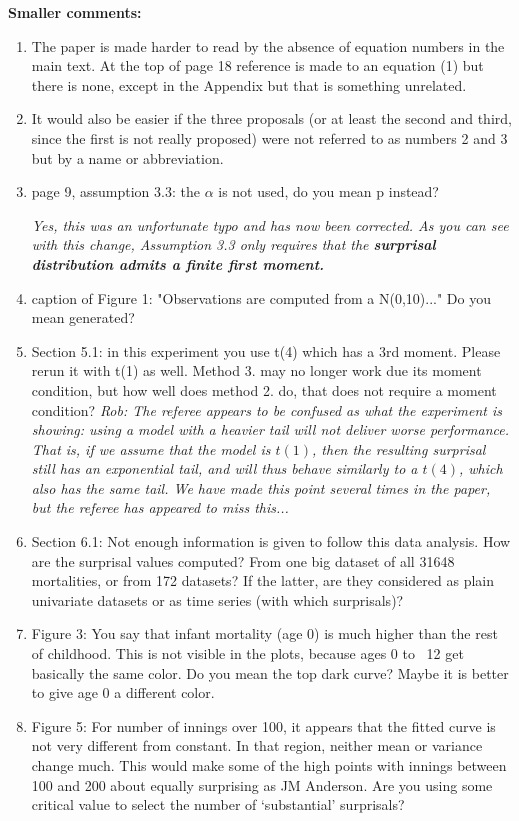 \documentclass[a4paper,11pt]{article}
\begin{document}
\noindent \textbf{Smaller comments:}
\begin{enumerate}
  \item[-] The paper is made harder to read by the absence of equation numbers in the main text. At the top of page 18 reference is made to an equation (1) but there is none, except in the Appendix but that is something unrelated.
  \item[-] It would also be easier if the three proposals (or at least the second and third, since the first is not really proposed) were not referred to as numbers 2 and 3 but by a name or abbreviation.
  \item[-] page 9, assumption 3.3: the $\alpha$ is not used, do you mean p instead?

    \textit{Yes, this was an unfortunate typo and has now been corrected. As you can see with this change, Assumption 3.3 only requires that the \textbf{surprisal distribution admits a finite first moment.}}
  \item[-] caption of Figure 1: "Observations are computed from a N(0,10)..." Do you mean generated?
  \item[-] Section 5.1: in this experiment you use t(4) which has a 3rd moment. Please rerun it with t(1) as well. Method 3. may no longer work due its moment condition, but how well does method 2. do, that does not require a moment condition?
    \textit{{\color{red}Rob: The referee appears to be confused as what the experiment is showing: using a model with a heavier tail will not deliver worse performance. That is, if we assume that the model is $t(1)$, then the resulting surprisal still has an exponential tail, and will thus behave similarly to a $t(4)$, which also has the same tail. We have made this point several times in the paper, but the referee has appeared to miss this...}}

  \item[-] Section 6.1: Not enough information is given to follow this data analysis. How are the surprisal values computed? From one big dataset of all 31648 mortalities, or from 172 datasets? If the latter, are they considered as plain univariate datasets or as time series (with which surprisals)?
  \item[-] Figure 3: You say that infant mortality (age 0) is much higher than the rest of childhood. This is not visible in the plots, because ages 0 to ~12 get basically the same color. Do you mean the top dark curve? Maybe it is better to give age 0 a different color.
  \item[-] Figure 5: For number of innings over 100, it appears that the fitted curve is not very different from constant. In that region, neither mean or variance change much. This would make some of the high points with innings between 100 and 200 about equally surprising as JM Anderson. Are you using some critical value to select the number of `substantial' surprisals?
\end{enumerate}
\end{document}
